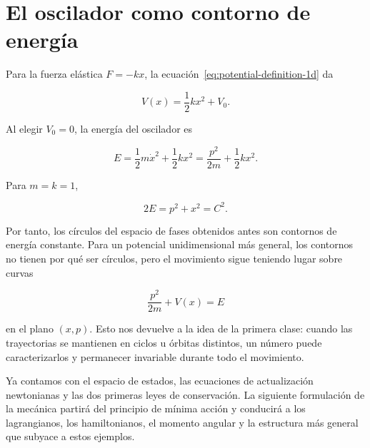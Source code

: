 \section{El oscilador como contorno de energía}\enlargethispage{3\baselineskip}

Para la fuerza elástica \(F=-kx\), la ecuación~\eqref{eq:potential-definition-1d} da

\begin{equation}
  V(x)=\frac12kx^2+V_0.
  \label{eq:spring-potential}
\end{equation}

Al elegir \(V_0=0\), la energía del oscilador es

\begin{equation}
  E=\frac12m\dot x^2+\frac12kx^2
   =\frac{p^2}{2m}+\frac12kx^2.
  \label{eq:oscillator-energy}
\end{equation}

Para \(m=k=1\),

\begin{equation}
  2E=p^2+x^2=C^2.
  \label{eq:oscillator-energy-circle}
\end{equation}

Por tanto, los círculos del espacio de fases obtenidos antes son contornos de energía constante. Para un potencial unidimensional más general, los contornos no tienen por qué ser círculos, pero el movimiento sigue teniendo lugar sobre curvas

\begin{equation}
  \frac{p^2}{2m}+V(x)=E
  \label{eq:general-energy-contour}
\end{equation}

en el plano \((x,p)\). Esto nos devuelve a la idea de la primera clase: cuando las trayectorias se mantienen en ciclos u órbitas distintos, un número puede caracterizarlos y permanecer invariable durante todo el movimiento.

Ya contamos con el espacio de estados, las ecuaciones de actualización newtonianas y las dos primeras leyes de conservación. La siguiente formulación de la mecánica partirá del principio de mínima acción y conducirá a los lagrangianos, los hamiltonianos, el momento angular y la estructura más general que subyace a estos ejemplos.

\begin{classroomqa}\end{classroomqa}